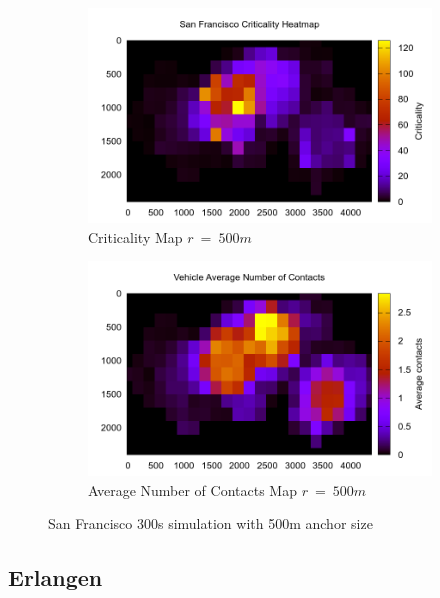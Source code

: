 \begin{figure}[h]
	\centering
	\begin{subfigure}[t]{0.5\textwidth}
 		\includegraphics[width=\textwidth]{img/SanFrancisco/criticality3_sim_SanFrancisco6_300s_500m}
 		\caption{Criticality Map $r\ =\ 500m$}
 		\label{fig:San_Francisco_criticality_300s_500m}
 	\end{subfigure}%
 	\hfill
 	\begin{subfigure}[t]{0.5\textwidth}
 		\includegraphics[width=\textwidth]{img/SanFrancisco/avgContacts_sim_SanFrancisco6_300s_500m}
 		\caption{Average Number of Contacts Map $r\ =\ 500m$}
 		\label{fig:San_Francisco_avg_300s_500m}
 	\end{subfigure}
 	\caption{San Francisco 300s simulation with 500m anchor size}
 	\label{fig:San_Francisco_300s_500m}
\end{figure}

\subsection{Erlangen}

